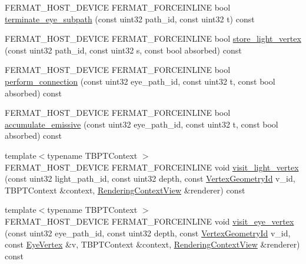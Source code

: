 \begin{DoxyCompactItemize}
\item 
F\+E\+R\+M\+A\+T\+\_\+\+H\+O\+S\+T\+\_\+\+D\+E\+V\+I\+CE F\+E\+R\+M\+A\+T\+\_\+\+F\+O\+R\+C\+E\+I\+N\+L\+I\+NE bool \hyperlink{struct_b_p_t_config_base_a5cafb898a6535d4fee6d98df875fe1ae}{terminate\+\_\+eye\+\_\+subpath} (const uint32 path\+\_\+id, const uint32 t) const
\item 
F\+E\+R\+M\+A\+T\+\_\+\+H\+O\+S\+T\+\_\+\+D\+E\+V\+I\+CE F\+E\+R\+M\+A\+T\+\_\+\+F\+O\+R\+C\+E\+I\+N\+L\+I\+NE bool \hyperlink{struct_b_p_t_config_base_afa468245a9b87bcc49abc7132de7a58c}{store\+\_\+light\+\_\+vertex} (const uint32 path\+\_\+id, const uint32 s, const bool absorbed) const
\item 
F\+E\+R\+M\+A\+T\+\_\+\+H\+O\+S\+T\+\_\+\+D\+E\+V\+I\+CE F\+E\+R\+M\+A\+T\+\_\+\+F\+O\+R\+C\+E\+I\+N\+L\+I\+NE bool \hyperlink{struct_b_p_t_config_base_a546ae2aa2926db1702688da6c23aa3e7}{perform\+\_\+connection} (const uint32 eye\+\_\+path\+\_\+id, const uint32 t, const bool absorbed) const
\item 
F\+E\+R\+M\+A\+T\+\_\+\+H\+O\+S\+T\+\_\+\+D\+E\+V\+I\+CE F\+E\+R\+M\+A\+T\+\_\+\+F\+O\+R\+C\+E\+I\+N\+L\+I\+NE bool \hyperlink{struct_b_p_t_config_base_a333fa484bf5a9f4ad12f6a7ed48632d4}{accumulate\+\_\+emissive} (const uint32 eye\+\_\+path\+\_\+id, const uint32 t, const bool absorbed) const
\item 
{\footnotesize template$<$typename T\+B\+P\+T\+Context $>$ }\\F\+E\+R\+M\+A\+T\+\_\+\+H\+O\+S\+T\+\_\+\+D\+E\+V\+I\+CE F\+E\+R\+M\+A\+T\+\_\+\+F\+O\+R\+C\+E\+I\+N\+L\+I\+NE void \hyperlink{struct_b_p_t_config_base_a9a948bffb4f173adc48f156d02d000bb}{visit\+\_\+light\+\_\+vertex} (const uint32 light\+\_\+path\+\_\+id, const uint32 depth, const \hyperlink{struct_vertex_geometry_id}{Vertex\+Geometry\+Id} v\+\_\+id, T\+B\+P\+T\+Context \&context, \hyperlink{struct_rendering_context_view}{Rendering\+Context\+View} \&renderer) const
\item 
{\footnotesize template$<$typename T\+B\+P\+T\+Context $>$ }\\F\+E\+R\+M\+A\+T\+\_\+\+H\+O\+S\+T\+\_\+\+D\+E\+V\+I\+CE F\+E\+R\+M\+A\+T\+\_\+\+F\+O\+R\+C\+E\+I\+N\+L\+I\+NE void \hyperlink{struct_b_p_t_config_base_ac1ecb6f3ef04718305291fedf76cec85}{visit\+\_\+eye\+\_\+vertex} (const uint32 eye\+\_\+path\+\_\+id, const uint32 depth, const \hyperlink{struct_vertex_geometry_id}{Vertex\+Geometry\+Id} v\+\_\+id, const \hyperlink{struct_eye_vertex}{Eye\+Vertex} \&v, T\+B\+P\+T\+Context \&context, \hyperlink{struct_rendering_context_view}{Rendering\+Context\+View} \&renderer) const
\end{DoxyCompactItemize}
